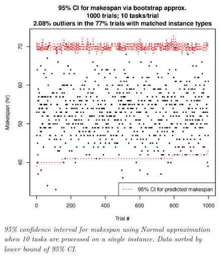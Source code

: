 \documentclass[12pt]{report}
\begin{document}
\begin{figure}
\includegraphics[width=1\textwidth]{validate-stochastic-runtimes-1000-trials-10-tasks.eps}
\caption{\textit{95\% confidence interval for makespan using Normal approximation when 10 tasks are processed on a single instance. Data sorted by lower bound of 95\% CI.}}
\label{fig:validate-stochastic-runtimes-1000-trials-10-tasks}
\end{figure}
\end{document}
